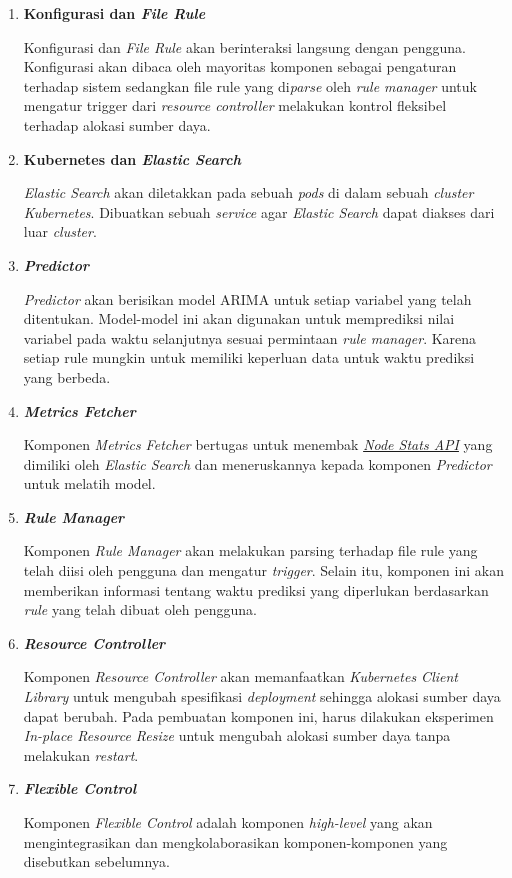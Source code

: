 \begin{enumerate}
    \item \textbf{Konfigurasi dan \textit{File Rule}}
    
    Konfigurasi dan \textit{File Rule} akan berinteraksi langsung dengan pengguna. Konfigurasi akan dibaca oleh mayoritas komponen sebagai pengaturan terhadap sistem sedangkan file rule yang di\textit{parse} oleh \textit{rule manager} untuk mengatur trigger dari \textit{resource controller} melakukan kontrol fleksibel terhadap alokasi sumber daya.

    \item \textbf{Kubernetes dan \textit{Elastic Search}}
    
    \textit{Elastic Search} akan diletakkan pada sebuah \textit{pods} di dalam sebuah \textit{cluster Kubernetes}. Dibuatkan sebuah \textit{service} agar \textit{Elastic Search} dapat diakses dari luar \textit{cluster}.
    
    \item \textbf{\textit{Predictor}}
    
    \textit{Predictor} akan berisikan model ARIMA untuk setiap variabel yang telah ditentukan. Model-model ini akan digunakan untuk memprediksi nilai variabel pada waktu selanjutnya sesuai permintaan \textit{rule manager}. Karena setiap rule mungkin untuk memiliki keperluan data untuk waktu prediksi yang berbeda.

    \item \textbf{\textit{Metrics Fetcher}}
    
    Komponen \textit{Metrics Fetcher} bertugas untuk menembak \href{https://www.elastic.co/guide/en/elasticsearch/reference/current/cluster-nodes-stats.html}{\textit{Node Stats API}} yang dimiliki oleh \textit{Elastic Search} dan meneruskannya kepada komponen \textit{Predictor} untuk melatih model.

    \item \textbf{\textit{Rule Manager}}
    
    Komponen \textit{Rule Manager} akan melakukan parsing terhadap file rule yang telah diisi oleh pengguna dan mengatur \textit{trigger}. Selain itu, komponen ini akan memberikan informasi tentang waktu prediksi yang diperlukan berdasarkan \textit{rule} yang telah dibuat oleh pengguna.

    \item \textbf{\textit{Resource Controller}}
    
    Komponen \textit{Resource Controller} akan memanfaatkan \textit{Kubernetes Client Library} untuk mengubah spesifikasi \textit{deployment} sehingga alokasi sumber daya dapat berubah. Pada pembuatan komponen ini, harus dilakukan eksperimen \textit{In-place Resource Resize} untuk mengubah alokasi sumber daya tanpa melakukan \textit{restart}.

    \item \textbf{\textit{Flexible Control}}
    
    Komponen \textit{Flexible Control} adalah komponen \textit{high-level} yang akan mengintegrasikan dan mengkolaborasikan komponen-komponen yang disebutkan sebelumnya.
\end{enumerate}